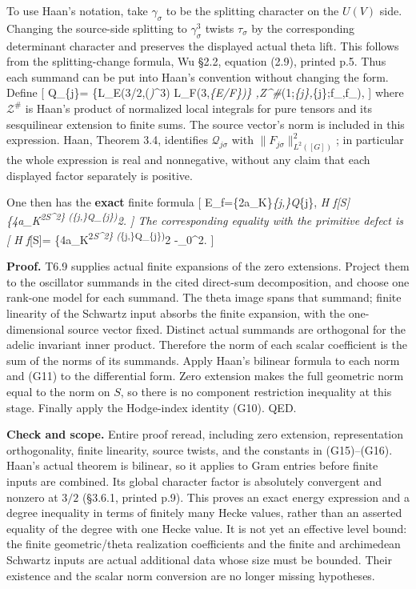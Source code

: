 \documentclass[11pt,a4paper]{article}
\theoremstyle{definition}
\begin{document}
To use Haan's notation, take \(\gamma_\sigma\) to be the splitting
character on the \(U(V)\) side. Changing the source-side splitting to
\(\gamma_\sigma^3\) twists \(\tau_\sigma\) by the corresponding
determinant character and preserves the displayed actual theta lift.
This follows from the splitting-change formula, Wu §2.2, equation (2.9),
printed p.5. Thus each summand can be put into Haan's convention without
changing the form. Define {[} \mathcal Q\_\{j\sigma\}=
\{L\_E(3/2,(\tau\emph{\sigma)\otimes\gamma}\sigma\^{}3)
\over L\_F(3,\epsilon\emph{\{E/F\})\}
,\mathcal Z\^{}\#}\sigma(1;\phi\emph{\{j\sigma\},\phi}\{j\sigma\};f\_\sigma,f\_\sigma),
 {]} where \(\mathcal Z^\#\) is Haan's product of normalized
local integrals for pure tensors and its sesquilinear extension to
finite sums. The source vector's norm is included in this expression.
Haan, Theorem 3.4, identifies \(\mathcal Q_{j\sigma}\) with
\(\|F_{j\sigma}\|^2_{L^2([G])}\); in particular the whole expression is
real and nonnegative, without any claim that each displayed factor
separately is positive.

One then has the \textbf{exact} finite formula {[}
E\_f=\{2\over a\_K\}\sum\emph{\{j,\sigma\}\mathcal Q}\{j\sigma\}, \qquad
\deg\emph{H f{[}S{]}\le
\{4\over a\_K\textsuperscript{2\int\emph{S\omega\^{}2\}
\left(\sum}\{j,\sigma\}\mathcal Q\_\{j\sigma\}\right)}2.  {]}
The corresponding equality with the primitive defect is {[} \deg\emph{H
f}}{[}S{]}= \{4\over a\_K\textsuperscript{2\int\emph{S\omega\^{}2\}
\left(\sum}\{j,\sigma\}\mathcal Q\_\{j\sigma\}\right)}2
-\textbar{}\beta\_0\textbar\^{}2.  {]}

\textbf{Proof.} T6.9 supplies actual finite expansions of the zero
extensions. Project them to the oscillator summands in the cited
direct-sum decomposition, and choose one rank-one model for each
summand. The theta image spans that summand; finite linearity of the
Schwartz input absorbs the finite expansion, with the one-dimensional
source vector fixed. Distinct actual summands are orthogonal for the
adelic invariant inner product. Therefore the norm of each scalar
coefficient is the sum of the norms of its summands. Apply Haan's
bilinear formula to each norm and (G11) to the differential form. Zero
extension makes the full geometric norm equal to the norm on \(S\), so
there is no component restriction inequality at this stage. Finally
apply the Hodge-index identity (G10). QED.

\textbf{Check and scope.} Entire proof reread, including zero extension,
representation orthogonality, finite linearity, source twists, and the
constants in (G15)--(G16). Haan's actual theorem is bilinear, so it
applies to Gram entries before finite inputs are combined. Its global
character factor is absolutely convergent and nonzero at \(3/2\)
(§3.6.1, printed p.9). This proves an exact energy expression and a
degree inequality in terms of finitely many Hecke values, rather than an
asserted equality of the degree with one Hecke value. It is not yet an
effective level bound: the finite geometric/theta realization
coefficients and the finite and archimedean Schwartz inputs are actual
additional data whose size must be bounded. Their existence and the
scalar norm conversion are no longer missing hypotheses.
\end{document}

